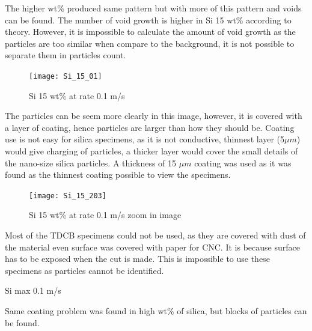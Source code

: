 \documentclass[numbers=noendperiod,chapterprefix=on]{icldt} %
\begin{document}
{The higher wt\% produced same pattern but with more of this pattern and voids can be found. The number of void growth is higher in Si 15 wt\% according to theory.  However, it is impossible to calculate the amount of void growth as the particles are too similar when compare to the background, it is not possible to separate them in particles count.

\begin{figure}[!hp]
\centering
\texttt{[image: Si\_15\_01]}
\caption{Si 15 wt\% at rate 0.1 m/s} \label{Si_15_01}
\end{figure}
\FloatBarrier

The particles can be seem more clearly in this image, however, it is covered with a layer of coating, hence particles are larger than how they should be. Coating use is not easy for silica specimens, as it is not conductive, thinnest layer (5$ \mu m$) would give charging of particles, a thicker layer would cover the small details of the nano-size silica particles. A thickness of 15 $ \mu  m$ coating was used as it was found as the thinnest coating possible to view the specimens.

\begin{figure}[!hp]
\centering
\texttt{[image: Si\_15\_203]}
\caption{Si 15 wt\% at rate 0.1 m/s zoom in image} \label{Si_15_203}
\end{figure}
\FloatBarrier







Most of the TDCB specimens could not be used, as they are covered with dust of the material even surface was covered with paper for CNC. It is because surface has to be exposed when the cut is made. This is impossible to use these specimens as particles cannot be identified. 

Si max 0.1 m/s

Same coating problem was found in high wt\% of silica, but blocks of particles can be found.

}
\end{document}
